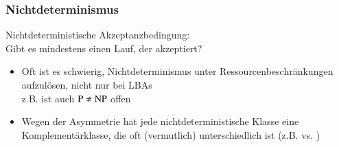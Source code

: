 \documentclass[onlymath]{beamer}
\begin{document}
\begin{frame}\frametitle{Nichtdeterminismus}

\alert{Nichtdeterministische Akzeptanzbedingung:}
\\Gibt es mindestens einen Lauf, der akzeptiert?\\
\bigskip

\bigskip

\begin{itemize}
\item Oft ist es schwierig, Nichtdeterminismus unter Ressourcenbeschränkungen aufzulösen, nicht nur bei LBAs\\
z.B. ist auch ${\textsc{P}}\neq{\textsc{NP}}$ offen
\item Wegen der Asymmetrie hat jede nichtdeterministische Klasse eine Komplementärklasse, die oft (vermutlich) unterschiedlich ist (z.B.  vs. )
\end{itemize}

\end{frame}
\end{document}
